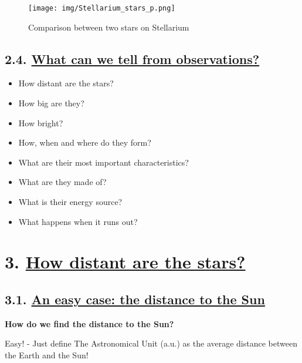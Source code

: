 \documentclass[
  letterpaper,
  DIV=11,
  numbers=noendperiod]{scrreprt}
\providecommand{\tightlist}{%
  \setlength{\itemsep}{0pt}\setlength{\parskip}{0pt}}\usepackage{longtable,booktabs,array}
\begin{document}
\begin{figure}

{\centering \texttt{[image: img/Stellarium\_stars\_p.png]}

}

\caption{Comparison between two stars on Stellarium}

\end{figure}

\hypertarget{what-can-we-tell-from-observations}{%
\section{\texorpdfstring{2.4. \protect\hyperlink{toc0_}{What can we tell
from
observations?}}{2.4. What can we tell from observations?}}\label{what-can-we-tell-from-observations}}

\begin{itemize}
\tightlist
\item
  How distant are the stars?
\item
  How big are they?
\item
  How bright?
\item
  How, when and where do they form?
\item
  What are their most important characteristics?
\item
  What are they made of?
\item
  What is their energy source?
\item
  What happens when it runs out?
\end{itemize}

\hypertarget{how-distant-are-the-stars}{%
\chapter{\texorpdfstring{3. \protect\hyperlink{toc0_}{How distant are
the
stars?}}{3. How distant are the stars?}}\label{how-distant-are-the-stars}}

\hypertarget{an-easy-case-the-distance-to-the-sun}{%
\section{\texorpdfstring{3.1. \protect\hyperlink{toc0_}{An easy case:
the distance to the
Sun}}{3.1. An easy case: the distance to the Sun}}\label{an-easy-case-the-distance-to-the-sun}}

\textbf{How do we find the distance to the Sun?}

Easy! - Just define The Astronomical Unit (a.u.) as the average distance
between the Earth and the Sun!
\end{document}
